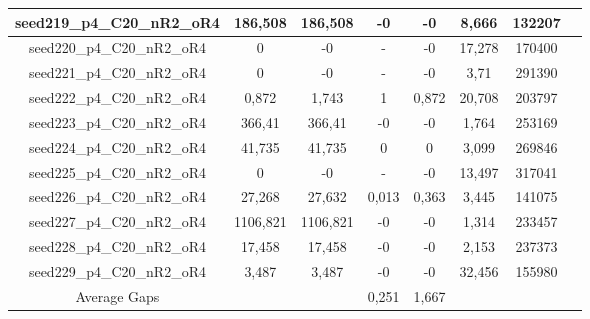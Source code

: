\documentclass[a4paper]{article}
\begin{document}
\begin{center}
\begin{longtable}{cccccccc}
\hline
seed219\_p4\_C20\_nR2\_oR4 & 186,508 & 186,508 & -0 & -0 & 8,666 & 132207\\
\hline
seed220\_p4\_C20\_nR2\_oR4 & 0 & -0 & - & -0 & 17,278 & 170400\\
\hline
seed221\_p4\_C20\_nR2\_oR4 & 0 & -0 & - & -0 & 3,71 & 291390\\
\hline
seed222\_p4\_C20\_nR2\_oR4 & 0,872 & 1,743 & 1 & 0,872 & 20,708 & 203797\\
\hline
seed223\_p4\_C20\_nR2\_oR4 & 366,41 & 366,41 & -0 & -0 & 1,764 & 253169\\
\hline
seed224\_p4\_C20\_nR2\_oR4 & 41,735 & 41,735 & 0 & 0 & 3,099 & 269846\\
\hline
seed225\_p4\_C20\_nR2\_oR4 & 0 & -0 & - & -0 & 13,497 & 317041\\
\hline
seed226\_p4\_C20\_nR2\_oR4 & 27,268 & 27,632 & 0,013 & 0,363 & 3,445 & 141075\\
\hline
seed227\_p4\_C20\_nR2\_oR4 & 1106,821 & 1106,821 & -0 & -0 & 1,314 & 233457\\
\hline
seed228\_p4\_C20\_nR2\_oR4 & 17,458 & 17,458 & -0 & -0 & 2,153 & 237373\\
\hline
seed229\_p4\_C20\_nR2\_oR4 & 3,487 & 3,487 & -0 & -0 & 32,456 & 155980\\
\hline
\hline
Average Gaps & & & 0,251 & 1,667 & & \\
\hline
\hline
\end{longtable}
\end{center}
\end{document}

